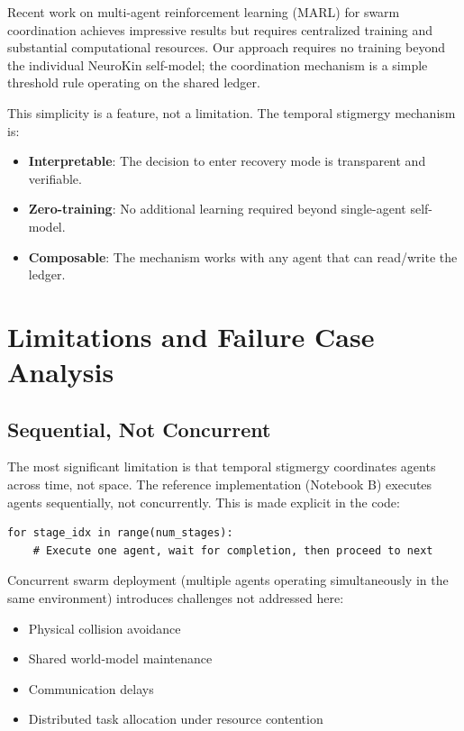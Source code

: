 \documentclass[12pt,a4paper,oneside]{report}
\begin{document}
Recent work on multi-agent reinforcement learning (MARL) for swarm coordination \cite{domberg2026selfadapting, daneshmand2026slowrl} achieves impressive results but requires centralized training and substantial computational resources. Our approach requires no training beyond the individual NeuroKin self-model; the coordination mechanism is a simple threshold rule operating on the shared ledger.

This simplicity is a feature, not a limitation. The temporal stigmergy mechanism is:
\begin{itemize}
    \item \textbf{Interpretable}: The decision to enter recovery mode is transparent and verifiable.
    \item \textbf{Zero-training}: No additional learning required beyond single-agent self-model.
    \item \textbf{Composable}: The mechanism works with any agent that can read/write the ledger.
\end{itemize}

\section{Limitations and Failure Case Analysis}

\subsection{Sequential, Not Concurrent}

The most significant limitation is that temporal stigmergy coordinates agents across time, not space. The reference implementation (Notebook B) executes agents sequentially, not concurrently. This is made explicit in the code:

\begin{verbatim}
for stage_idx in range(num_stages):
    # Execute one agent, wait for completion, then proceed to next
\end{verbatim}

Concurrent swarm deployment (multiple agents operating simultaneously in the same environment) introduces challenges not addressed here:
\begin{itemize}
    \item Physical collision avoidance
    \item Shared world-model maintenance
    \item Communication delays
    \item Distributed task allocation under resource contention
\end{itemize}
\end{document}
